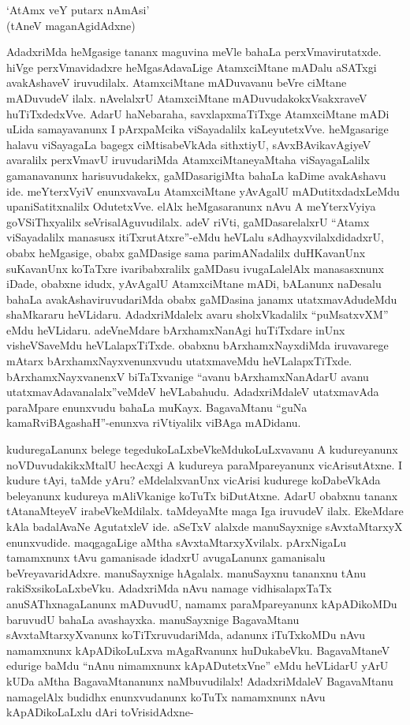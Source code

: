 \begin{shloka}
`AtAmx veY putarx nAmAsi'\\
(tAneV maganAgidAdxne)
\end{shloka}

AdadxriMda heMgasige tananx maguvina meVle bahaLa perxVmavirutatxde. hiVge perxVmavidadxre heMgasAdavaLige AtamxciMtane mADalu aSATxgi avakAshaveV iruvudilalx. AtamxciMtane mADuvavanu beVre ciMtane mADuvudeV ilalx. nAvelalxrU AtamxciMtane mADuvudakokxVsakxraveV huTiTxdedxVve. AdarU haNebaraha, savxlapxmaTiTxge AtamxciMtane mADi uLida samayavanunx I pArxpaMcika viSayadalilx kaLeyutetxVve. heMgasarige halavu viSayagaLa bagegx ciMtisabeVkAda sithxtiyU, sAvxBAvikavAgiyeV avaralilx perxVmavU iruvudariMda AtamxciMtaneyaMtaha viSayagaLalilx gamanavanunx harisuvudakekx, gaMDasarigiMta bahaLa kaDime avakAshavu ide. meYterxVyiV enunxvavaLu AtamxciMtane yAvAgalU mADutitxdadxLeMdu upaniSatitxnalilx OdutetxVve. elAlx heMgasaranunx nAvu A meYterxVyiya goVSiThxyalilx seVrisalAguvudilalx. adeV riVti, gaMDasarelalxrU ``Atamx viSayadalilx manasusx itiTxrutAtxre''-eMdu heVLalu sAdhayxvilalxdidadxrU, obabx heMgasige, obabx gaMDasige sama parimANadalilx duHKavanUnx suKavanUnx koTaTxre ivaribabxralilx gaMDasu ivugaLalelAlx manasasxnunx iDade, obabxne idudx, yAvAgalU AtamxciMtane mADi, bALanunx naDesalu bahaLa avakAshaviruvudariMda obabx gaMDasina janamx utatxmavAdudeMdu shaMkararu heVLidaru. AdadxriMdalelx avaru sholxVkadalilx ``puMsatxvXM'' eMdu heVLidaru. adeVneMdare bArxhamxNanAgi huTiTxdare inUnx visheVSaveMdu heVLalapxTiTxde. obabxnu bArxhamxNayxdiMda iruvavarege mAtarx bArxhamxNayxvenunxvudu utatxmaveMdu heVLalapxTiTxde. bArxhamxNayxvanenxV biTaTxvanige ``avanu bArxhamxNanAdarU avanu utatxmavAdavanalalx''veMdeV heVLabahudu. AdadxriMdaleV utatxmavAda paraMpare enunxvudu bahaLa muKayx. BagavaMtanu ``guNa kamaRviBAgashaH''-enunxva riVtiyalilx viBAga mADidanu.

kuduregaLanunx belege tegedukoLaLxbeVkeMdukoLuLxvavanu A kudureyanunx noVDuvudakikxMtalU hecAcxgi A kudureya paraMpareyanunx vicArisutAtxne. I kudure tAyi, taMde yAru? eMdelalxvanUnx vicArisi kudurege koDabeVkAda beleyanunx kudureya mAliVkanige koTuTx biDutAtxne. AdarU obabxnu tananx tAtanaMteyeV irabeVkeMdilalx. taMdeyaMte maga Iga iruvudeV ilalx. EkeMdare kAla badalAvaNe AgutatxleV ide. aSeTxV alalxde manuSayxnige sAvxtaMtarxyX enunxvudide. maqgagaLige aMtha sAvxtaMtarxyXvilalx. pArxNigaLu tamamxnunx tAvu gamanisade idadxrU avugaLanunx gamanisalu beVreyavaridAdxre. manuSayxnige hAgalalx. manuSayxnu tananxnu tAnu rakiSxsikoLaLxbeVku. AdadxriMda nAvu namage vidhisalapxTaTx anuSAThxnagaLanunx mADuvudU, namamx paraMpareyanunx kApADikoMDu baruvudU bahaLa avashayxka. manuSayxnige BagavaMtanu sAvxtaMtarxyXvanunx koTiTxruvudariMda, adanunx iTuTxkoMDu nAvu namamxnunx kApADikoLuLxva mAgaRvanunx huDukabeVku. BagavaMtaneV edurige baMdu ``nAnu nimamxnunx kApADutetxVne'' eMdu heVLidarU yArU kUDa aMtha BagavaMtananunx naMbuvudilalx! AdadxriMdaleV BagavaMtanu namagelAlx budidhx enunxvudanunx koTuTx namamxnunx nAvu kApADikoLaLxlu dAri toVrisidAdxne-


